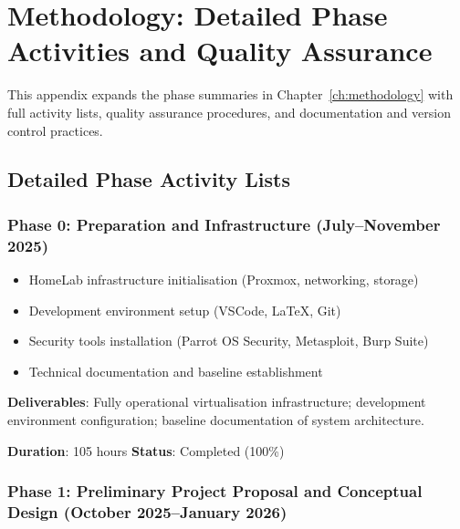 
\chapter{Methodology: Detailed Phase Activities and Quality Assurance}
\label{app:methodology-detail}

This appendix expands the phase summaries in Chapter~\ref{ch:methodology} with full
activity lists, quality assurance procedures, and documentation and version control practices.

\section{Detailed Phase Activity Lists}

\subsection{Phase 0: Preparation and Infrastructure (July--November 2025)}

\begin{itemize}
\item HomeLab infrastructure initialisation (Proxmox\cite{proxmox}, networking, storage)
\item Development environment setup (VSCode\cite{vscode}, LaTeX\cite{latex_project}, Git)
\item Security tools installation (Parrot OS Security\cite{parrot_os},
      Metasploit\cite{metasploit}, Burp Suite\cite{burp_suite})
\item Technical documentation and baseline establishment
\end{itemize}

\textbf{Deliverables}: Fully operational virtualisation infrastructure; development
environment configuration; baseline documentation of system architecture.

\textbf{Duration}: 105 hours \quad \textbf{Status}: Completed (100\%)

\subsection{Phase 1: Preliminary Project Proposal and Conceptual Design (October 2025--January 2026)}

